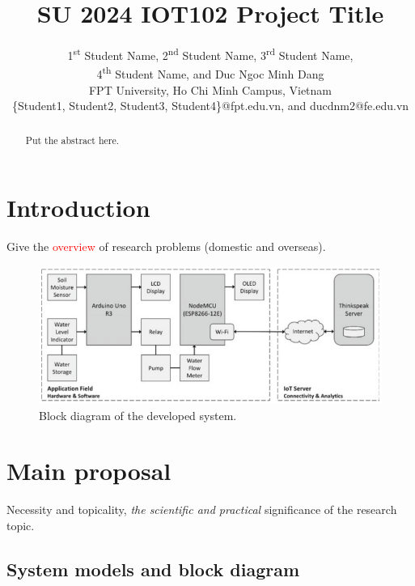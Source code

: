 \documentclass[conference, onecolumn]{IEEEtran}
\begin{document}
\title{SU 2024 IOT102 Project Title\\
}

\author{
1\textsuperscript{st} Student Name, 2\textsuperscript{nd} Student Name, 3\textsuperscript{rd} Student Name,\\ 4\textsuperscript{th} Student Name, and Duc Ngoc Minh Dang\\
FPT University, Ho Chi Minh Campus, Vietnam\\
\{Student1, Student2, Student3, Student4\}@fpt.edu.vn, and ducdnm2@fe.edu.vn}
\maketitle

\begin{abstract}
Put the abstract here.
\end{abstract}

\section{Introduction}
Give the \textcolor{red}{overview} of research problems (domestic and overseas).

\begin{figure}[htbp]
\centerline{\includegraphics[width=4.8 in]{Block_diagram.png}}
\caption{Block diagram of the developed system.}
\label{fig}
\end{figure}

\section{Main proposal}
Necessity and topicality, \emph{the scientific and practical} significance of the research topic.\\

\subsection{System models and block diagram}
\end{document}
